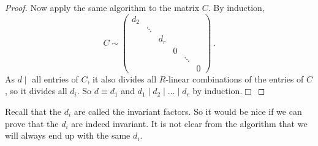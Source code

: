 \documentclass{article}
\theoremstyle{plain}\theoremheaderfont{\normalfont\itshape}\theorembodyfont{\rmfamily}\theoremseparator{.}\newtheorem*{rem}{Remark}\newtheorem*{ex}{Example}\newtheorem*{proof}{Proof}\newtheorem*{altp}{Alternative proof}\newtheorem*{nonex}{Non-Example}
\theoremstyle{plain}\theoremheaderfont{\normalfont\bfseries}\theorembodyfont{\rmfamily}\theoremseparator{.}\newtheorem{thm}{Theorem}[section]\newtheorem{lem}[thm]{Lemma}\newtheorem{prop}[thm]{Proposition}\newtheorem*{cor}{Corollary}\newtheorem{defn}[thm]{Definition}\newtheorem{clm}[thm]{Claim}\newtheorem{clminproof}{Claim}\newtheorem*{notn}{Notation}\newtheorem*{exer}{Exercise}\newtheorem*{lemnn}{Lemma}
\theoremstyle{break}\theoremheaderfont{\normalfont\itshape}\theorembodyfont{\rmfamily}\theoremseparator{.\medskip}\newtheorem*{proofskip}{Proof}\newtheorem*{exs}{Examples}\newtheorem*{rems}{Remarks}\newtheorem*{obs}{Observations}
\theoremstyle{break}\theoremheaderfont{\normalfont\bfseries}\theorembodyfont{\rmfamily}\theoremseparator{.\medskip}\newtheorem{lemskip}[thm]{Lemma}\newtheorem{defnskip}[thm]{Definition}\newtheorem{propskip}[thm]{Proposition}\newtheorem{thmskip}[thm]{Theorem}
\numberwithin{equation}{section}
\newcommand{\qed}{\hfill\ensuremath{\Box}}
\begin{document}
\begin{proof}
        Now apply the same algorithm to the matrix \(C\). By induction,
        \[C\sim\begin{pmatrix}
            d_2\\
            ~ & \ddots\\
            ~ & ~ & d_r\\
            ~ & ~ & ~ & 0\\
            ~ & ~ & ~ & ~ & \ddots\\
            ~ & ~ & ~ & ~ & ~ & 0
        \end{pmatrix}\,.\]
        As \(d\mid\) all entries of \(C\), it also divides all \(R\)-linear combinations of the entries of \(C\), so it divides all \(d_i\). So \(d\equiv d_1\) and \(d_1\mid d_2\mid\dots\mid d_r\) by induction.\qed
    \end{proof}
    Recall that the \(d_i\) are called the invariant factors. So it would be nice if we can prove that the \(d_i\) are indeed invariant. It is not clear from the algorithm that we will always end up with the same \(d_i\).
\end{document}
